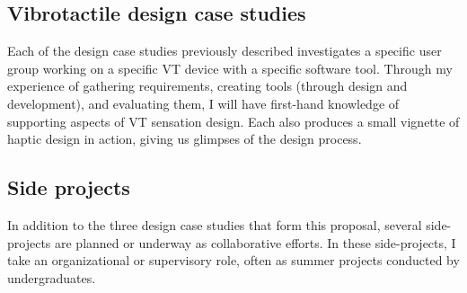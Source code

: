 \subsection{Vibrotactile design case studies}
Each of the  design case studies previously described investigates a specific user group working on a specific VT device with a specific software tool.
Through my experience of gathering requirements, creating tools (through design and development), and evaluating them, I will have first-hand knowledge of supporting aspects of VT sensation design.
Each also produces a small vignette of haptic design in action, giving us glimpses of the design process.

\subsection{Side projects}
In addition to the three design case studies that form this proposal, several side-projects are planned or underway as collaborative efforts.
In these side-projects, I take an organizational or supervisory role, often as summer projects conducted by undergraduates.

